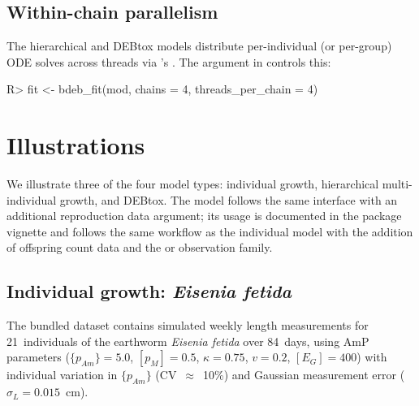 \documentclass[article,shortnames]{jss}
\newcommand{\pAm}{\{p_{Am}\}}
\newcommand{\pM}{[p_M]}
\newcommand{\EG}{[E_G]}
\begin{document}
\subsection{Within-chain parallelism} \label{sec:threading}

The hierarchical and DEBtox models distribute per-individual (or
per-group) ODE solves across threads via 's
.  The  argument in
 controls this:
\begin{CodeChunk}
\begin{CodeInput}
R> fit <- bdeb_fit(mod, chains = 4, threads_per_chain = 4)
\end{CodeInput}
\end{CodeChunk}


\section{Illustrations} \label{sec:illustrations}

We illustrate three of the four model types: individual growth,
hierarchical multi-individual growth, and DEBtox.  The
 model follows the same interface with an
additional reproduction data argument; its usage is documented in
the package vignette and follows the same workflow as the individual
model with the addition of offspring count data and the
 or  observation family.

\subsection[Individual growth: Eisenia fetida]{%
  Individual growth: \emph{Eisenia fetida}} \label{sec:ex_ind}

The bundled  dataset contains simulated weekly
length measurements for 21~individuals of the earthworm \emph{Eisenia
fetida} over 84~days, using AmP parameters ($\pAm = 5.0$,
$\pM = 0.5$, $\kappa = 0.75$, $v = 0.2$, $\EG = 400$) with
individual variation in $\pAm$ (CV~$\approx$~10\%) and Gaussian
measurement error ($\sigma_L = 0.015$~cm).

\begin{CodeChunk}
\end{CodeChunk}
\end{document}
